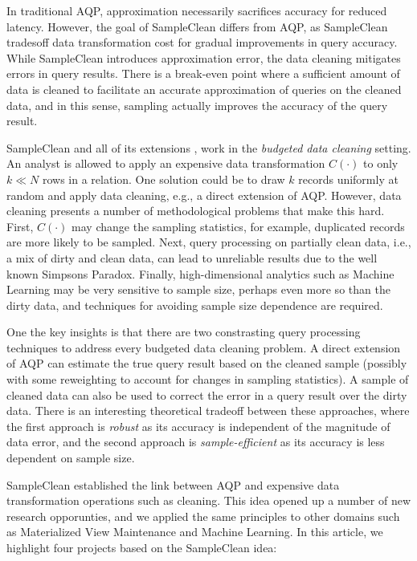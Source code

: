 In traditional AQP, approximation necessarily sacrifices accuracy for reduced latency. 
However, the goal of SampleClean differs from AQP, as SampleClean tradesoff data transformation cost for gradual improvements in query accuracy.
While SampleClean introduces approximation error, the data cleaning mitigates errors in query results.
There is a break-even point where a sufficient amount of data is cleaned to facilitate an accurate approximation of queries on the cleaned data, and in this sense, sampling actually improves the accuracy of the query result.

SampleClean \cite{wang1999sample} and all of its extensions \cite{krishnan2015svc}, work in the \emph{budgeted data cleaning} setting. 
An analyst is allowed to apply an expensive data transformation $C(\cdot)$ to only $k\ll N$ rows in a relation.
One solution could be to draw $k$ records uniformly at random and apply data cleaning, e.g., a direct extension of AQP.
However, data cleaning presents a number of methodological problems that make this hard.
First, $C(\cdot)$ may change the sampling statistics, for example, duplicated records are more likely to be sampled.
Next, query processing on partially clean data, i.e., a mix of dirty and clean data, can lead to unreliable results due to the well known Simpsons Paradox.
Finally, high-dimensional analytics such as Machine Learning may be very sensitive to sample size, perhaps even more so than the dirty data, and techniques for avoiding sample size dependence are required.

One the key insights is that there are two constrasting query processing techniques to address every budgeted data cleaning problem.
A direct extension of AQP can estimate the true query result based on the cleaned sample (possibly with some reweighting to account for changes in sampling statistics). 
A sample of cleaned data can also be used to correct the error in a query result over the dirty data.
There is an interesting theoretical tradeoff between these approaches, where the first approach is \emph{robust} as its accuracy is independent of the magnitude of data error, and the second approach is \emph{sample-efficient} as its accuracy is less dependent on sample size.

SampleClean established the link between AQP and expensive data transformation operations such as cleaning. 
This idea opened up a number of new research opporunties, and we applied the same principles to other domains such as Materialized View Maintenance and Machine Learning.
In this article, we highlight four projects based on the SampleClean idea:

